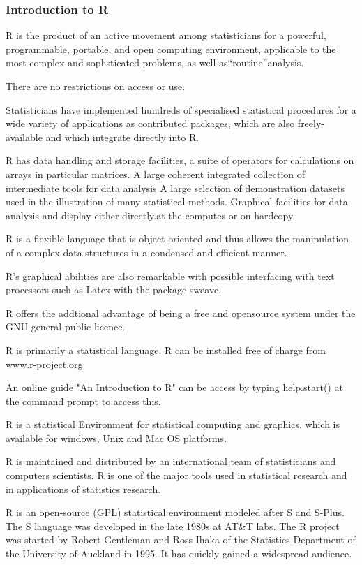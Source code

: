 
\begin{frame}

\frametitle{Introduction to R}

R is the product of an active movement among statisticians for a powerful, programmable, portable, and open computing environment, applicable to the most complex and sophsticated problems, as well as“routine”analysis.
 
There are no restrictions on access or use.


Statisticians have implemented hundreds of specialised statistical procedures for a wide variety of applications as contributed packages, which are also freely-available and which integrate directly into R.

 
R has data handling and storage facilities, a suite of operators for calculations on arrays in particular matrices. A large coherent integrated collection of intermediate tools for data analysis
A large selection of demonstration datasets used in the illustration of many statistical methods.
Graphical facilities for data analysis and display either directly.at the computes or on hardcopy.
 
\end{frame}
\begin{frame}
R is a flexible language that is object oriented and thus allows the manipulation of a complex data structures in a condensed and efficient manner.


R's graphical abilities are also remarkable with possible interfacing with text processors such as Latex with the package sweave.

R offers the addtional advantage of being a free and opensource system under the GNU general public licence.

R is primarily a statistical language. R can be installed free of charge from www.r-project.org
\end{frame}
\begin{frame}
An online guide "An Introduction to R" can be access by typing help.start() at the command prompt to access this.

R is a statistical Environment for statistical computing and graphics, which is available for windows, Unix and Mac OS platforms.

R is maintained and distributed by an international team of statisticians and computers scientists.
R is one of the major tools used in statistical research and in applications of statistics research.

R is an open-source (GPL) statistical environment modeled after S and S-Plus. The S language was developed in the late 1980s at AT&T labs. The R project was started by Robert Gentleman and Ross Ihaka of the Statistics Department of the University of Auckland in 1995. It has quickly gained a widespread audience. 
\end{frame}
